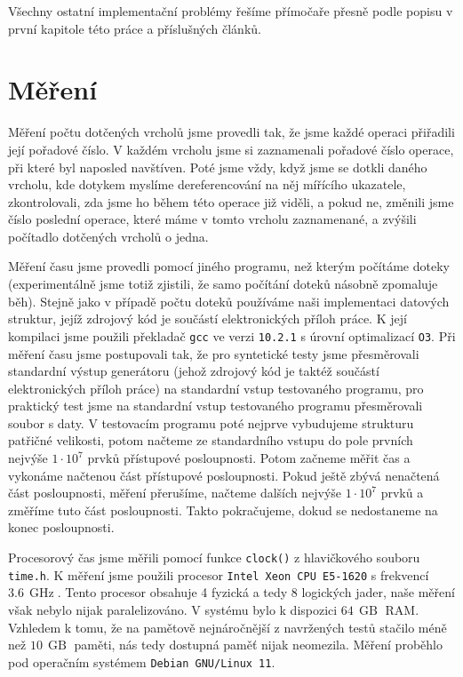 Všechny ostatní implementační problémy řešíme přímočaře přesně podle popisu v první kapitole této práce a příslušných článků.

\section{Měření}

Měření počtu dotčených vrcholů jsme provedli tak, že jsme každé operaci 
přiřadili její pořadové číslo. V každém vrcholu jsme si zaznamenali pořadové číslo
operace, při které byl naposled navštíven. Poté jsme vždy, když jsme se dotkli daného
vrcholu, kde dotykem myslíme dereferencování na něj mířícího ukazatele,
zkontrolovali, zda jsme ho během této operace již viděli, a pokud ne, změnili jsme
číslo poslední operace, které máme v tomto vrcholu zaznamenané, a zvýšili
počítadlo dotčených vrcholů o jedna.

Měření času jsme provedli pomocí jiného programu, než kterým počítáme doteky
(experimentálně jsme totiž zjistili, že samo počítání doteků násobně zpomaluje
běh). Stejně jako v případě počtu doteků používáme naši implementaci datových
struktur, jejíž zdrojový kód je součástí elektronických příloh práce. K její
kompilaci jsme použili překladač {\tt gcc} ve verzi {\tt 10.2.1} s úrovní
optimalizací {\tt O3}. Při měření času jsme postupovali tak, že pro syntetické
testy jsme přesměrovali standardní výstup generátoru (jehož zdrojový kód je
taktéž součástí elektronických příloh práce) na standardní vstup testovaného
programu, pro praktický test jsme na standardní vstup testovaného programu
přesměrovali soubor s daty. V testovacím programu poté nejprve vybudujeme
strukturu patřičné velikosti, potom načteme ze standardního vstupu do pole
prvních nejvýše $1\cdot10^7$ prvků přístupové posloupnosti. Potom začneme měřit
čas a vykonáme načtenou část přístupové posloupnosti. Pokud ještě zbývá
nenačtená část posloupnosti, měření přerušíme, načteme dalších nejvýše
$1\cdot10^7$ prvků a změříme tuto část posloupnosti. Takto pokračujeme, dokud
se nedostaneme na konec posloupnosti.

Procesorový čas jsme měřili pomocí funkce {\tt clock()} z hlavičkového souboru
{\tt time.h}. K měření jsme použili procesor {\tt Intel Xeon CPU E5-1620} s
frekvencí  $3.6\, \operatorname{GHz}$. Tento procesor obsahuje 4 fyzická a tedy
8 logických jader, naše měření však nebylo nijak paralelizováno. V systému bylo
k dispozici $64\,\operatorname{GB}$ RAM. Vzhledem k tomu, že na pamětově
nejnáročnější z navržených testů stačilo méně než $10\,\operatorname{GB}$
paměti, nás tedy dostupná paměť nijak neomezila. Měření proběhlo pod operačním
systémem {\tt Debian GNU/Linux 11}.

